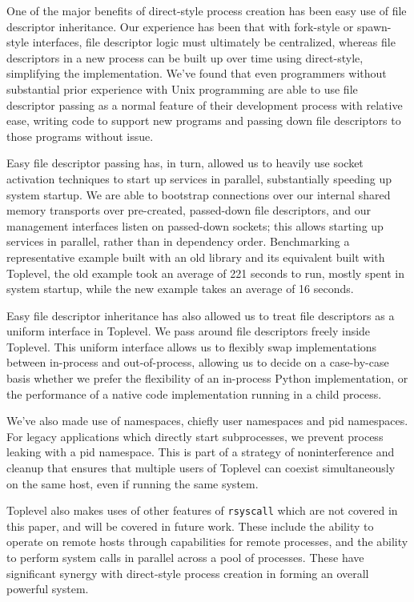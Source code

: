 \documentclass[letterpaper,twocolumn,10pt]{article}
\begin{document}
One of the major benefits of direct-style process creation has been easy use of file descriptor inheritance.
Our experience has been that with fork-style or spawn-style interfaces,
file descriptor logic must ultimately be centralized,
whereas file descriptors in a new process can be built up over time using direct-style,
simplifying the implementation.
We've found that even programmers without substantial prior experience with Unix programming
are able to use file descriptor passing as a normal feature of their development process with relative ease,
writing code to support new programs and passing down file descriptors to those programs without issue.

Easy file descriptor passing has, in turn, allowed us to heavily use socket activation techniques
to start up services in parallel,
substantially speeding up system startup\cite{socketactivation}.
We are able to bootstrap connections over our internal shared memory transports
over pre-created, passed-down file descriptors,
and our management interfaces listen on passed-down sockets;
this allows starting up services in parallel, rather than in dependency order.
Benchmarking a representative example built with an old library
and its equivalent built with Toplevel,
the old example took an average of 221 seconds to run,
mostly spent in system startup,
while the new example takes an average of 16 seconds.

Easy file descriptor inheritance has also allowed us to treat file descriptors as a uniform interface in Toplevel.
We pass around file descriptors freely inside Toplevel.
This uniform interface allows us to flexibly swap implementations between in-process and out-of-process,
allowing us to decide on a case-by-case basis
whether we prefer the flexibility of an in-process Python implementation,
or the performance of a native code implementation running in a child process.

We've also made use of namespaces,
chiefly user namespaces and pid namespaces.
For legacy applications which directly start subprocesses,
we prevent process leaking with a pid namespace.
This is part of a strategy of noninterference and cleanup
that ensures that multiple users of Toplevel
can coexist simultaneously on the same host,
even if running the same system.

Toplevel also makes uses of other features of \texttt{rsyscall} which are not covered in this paper,
and will be covered in future work.
These include the ability to operate on remote hosts through capabilities for remote processes,
and the ability to perform system calls in parallel across a pool of processes.
These have significant synergy with direct-style process creation
in forming an overall powerful system.
\end{document}
